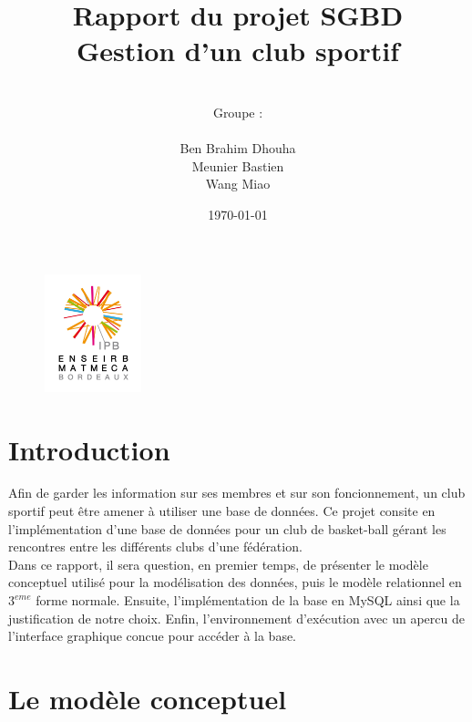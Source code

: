 \documentclass{article}
\date{\vspace{3 cm} \today}
\author{\vspace{4 cm} \\ Groupe :\\ \\Ben Brahim Dhouha\\Meunier Bastien\\Wang Miao }
\title{Rapport du projet SGBD \\ Gestion d'un club sportif}
\begin{document}
\newenvironment{narrow}[2]{%
\begin{list}{}{%
\setlength{\topsep}{0pt}%
\setlength{\leftmargin}{#1}%
\setlength{\rightmargin}{#2}%
\setlength{\listparindent}{\parindent}%
\setlength{\itemindent}{\parindent}%
\setlength{\parsep}{\parskip}%
}%
\item[]}{\end{list}}


\thispagestyle{empty}
\begin{figure}
\includegraphics[width=0.25\textwidth]{enseirb-matmeca.jpg}
\end{figure}
\maketitle

\newpage


\section*{Introduction}


Afin de garder les information sur ses membres et sur son foncionnement, un club sportif peut être amener à utiliser une base de données. Ce projet consite en l'implémentation d'une base de données pour un club de basket-ball gérant les rencontres entre les différents clubs d'une fédération. \\

Dans ce rapport, il sera question, en premier temps, de présenter le modèle conceptuel utilisé pour la modélisation des données, puis le modèle relationnel en $3^{eme}$ forme normale. Ensuite, l'implémentation de la base en MySQL ainsi que la justification de notre choix. Enfin, l'environnement d'exécution avec un apercu de l'interface graphique concue pour accéder à la base. 


\newpage
\tableofcontents

\newpage
\section{Le modèle conceptuel}
\end{document}
